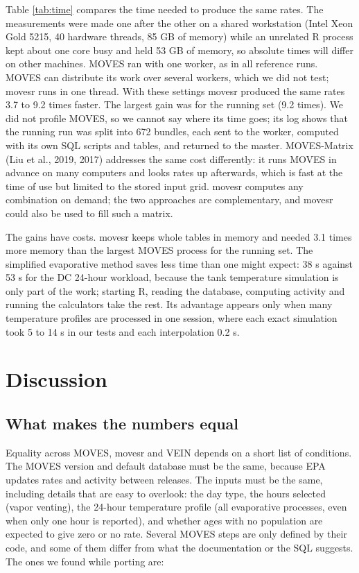 \documentclass[preprint,
3p]{elsarticle} %
\begin{document}
Table \ref{tab:time} compares the time needed to produce the same rates.
The measurements were made one after the other on a shared workstation
(Intel Xeon Gold 5215, 40 hardware threads, 85 GB of memory) while an
unrelated R process kept about one core busy and held 53 GB of memory,
so absolute times will differ on other machines. MOVES ran with one
worker, as in all reference runs. MOVES can distribute its work over
several workers, which we did not test; movesr runs in one thread. With
these settings movesr produced the same rates 3.7 to 9.2 times faster.
The largest gain was for the running set (9.2 times). We did not profile
MOVES, so we cannot say where its time goes; its log shows that the
running run was split into 672 bundles, each sent to the worker,
computed with its own SQL scripts and tables, and returned to the
master. MOVES-Matrix (Liu et al., 2019, 2017) addresses the same cost
differently: it runs MOVES in advance on many computers and looks rates
up afterwards, which is fast at the time of use but limited to the
stored input grid. movesr computes any combination on demand; the two
approaches are complementary, and movesr could also be used to fill such
a matrix.

The gains have costs. movesr keeps whole tables in memory and needed 3.1
times more memory than the largest MOVES process for the running set.
The simplified evaporative method saves less time than one might expect:
38 s against 53 s for the DC 24-hour workload, because the tank
temperature simulation is only part of the work; starting R, reading the
database, computing activity and running the calculators take the rest.
Its advantage appears only when many temperature profiles are processed
in one session, where each exact simulation took 5 to 14 s in our tests
and each interpolation 0.2 s.

\section{Discussion}\label{discussion}

\subsection{\texorpdfstring{What makes the numbers equal
\label{sec:quirks}}{What makes the numbers equal }}\label{what-makes-the-numbers-equal}

Equality across MOVES, movesr and VEIN depends on a short list of
conditions. The MOVES version and default database must be the same,
because EPA updates rates and activity between releases. The inputs must
be the same, including details that are easy to overlook: the day type,
the hours selected (vapor venting), the 24-hour temperature profile (all
evaporative processes, even when only one hour is reported), and whether
ages with no population are expected to give zero or no rate. Several
MOVES steps are only defined by their code, and some of them differ from
what the documentation or the SQL suggests. The ones we found while
porting are:
\end{document}
